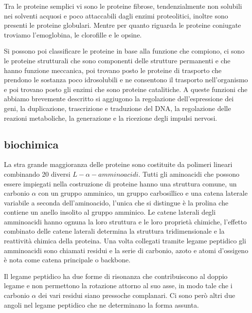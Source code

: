 Tra le proteine semplici vi sono le proteine fibrose, tendenzialmente non solubili nei solventi acquosi e poco attaccabili dagli enzimi proteolitici, inoltre sono
presenti le proteine globulari. Mentre per quanto riguarda le proteine coniugate troviamo l'emoglobina, le clorofille e le opsine.

Si possono poi classificare le proteine in base alla funzione che compiono, ci sono le proteine strutturali che sono componenti delle strutture permanenti e che 
hanno funzione meccanica, poi trovano posto le proteine di trasporto che prendono le sostanza poco idrosolubili e ne consentono il trasporto nell'organismo e poi
trovano posto gli enzimi che sono proteine catalitiche. A queste funzioni che abbiamo brevemente descritto si aggiugono la regolazione dell'espressione dei geni, 
la duplicazione, trascrizione e traduzione del DNA, la regolazione delle reazioni metaboliche, la generazione e la ricezione degli impulsi nervosi. 

\subsection{biochimica}\label{subsec:es_subsec}

La stra grande maggioranza delle proteine sono costituite da polimeri lineari combinando 20 diversi $L-\alpha-amminoacidi$. Tutti gli aminoacidi che possono essere 
impiegati nella costruzione di proteine hanno una struttura comune, un carbonio $\alpha$ con un gruppo amminico, un gruppo carbosillico e una catena laterale 
variabile a seconda dell'aminoacido, l'unica che si distingue è la prolina che contiene un anello insolito al gruppo amminico. Le catene laterali degli amminoacidi 
hanno ognuna la loro struttura e le loro proprietà chimiche, l'effetto combinato delle catene laterali determina la struttura tridimensionale e la reattività chimica
della proteina. Una volta collegati tramite legame peptidico gli amminoacidi sono chiamati residui e la serie di carbonio, azoto e atomi d'ossigeno è nota come 
catena principale o backbone.

Il legame peptidico ha due forme di risonanza che contribuiscono al doppio legame e non permettono la rotazione attorno al suo asse, in modo tale che i carbonio 
$\alpha$ dei vari residui siano pressoche complanari. Ci sono però altri due angoli nel legame peptidico che ne determinano la forma assunta. 

